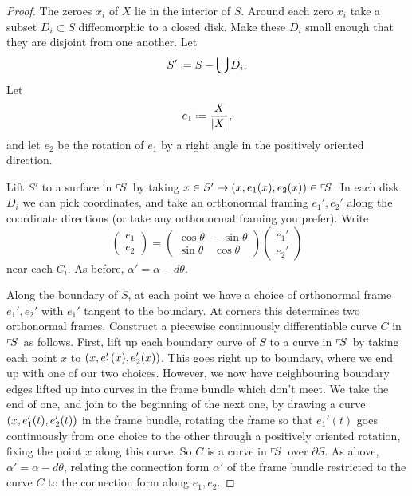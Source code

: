 \begin{proof}
The zeroes \(x_i\) of \(X\) lie in the interior of \(S\).
Around each zero \(x_i\) take a subset \(D_i \subset S\) diffeomorphic to a closed disk.
Make these \(D_i\) small enough that they are disjoint from one another.
Let 
\[
S' \defeq S-\bigcup D_i.
\]
Let 
\[
e_1 \defeq \frac{X}{\norm{X}},
\]
and let \(e_2\) be the rotation of \(e_1\) by a right angle in the positively oriented direction.

Lift \(S'\) to a surface in \(\left\ulcorner\!S\right.\) by taking \(x \in S' \mapsto \left(x,e_1(x),e_2(x)\right) \in \left\ulcorner\!S\right.\).
In each disk \(D_i\) we can pick coordinates, and take an orthonormal framing \(e_1', e_2'\) along the coordinate directions (or take any orthonormal framing you prefer).
Write
\[
\begin{pmatrix}
e_1 \\
e_2
\end{pmatrix}
=
\begin{pmatrix}
\cos \theta & -\sin \theta \\
\sin \theta & \cos \theta
\end{pmatrix}
\begin{pmatrix}
e_1' \\
e_2'
\end{pmatrix}
\]
near each \(C_i\).
As before, \(\alpha'=\alpha-d\theta\).

Along the boundary of \(S\), at each point we have a choice of orthonormal frame \(e_1', e_2'\) with \(e_1'\) tangent to the boundary. 
At corners this determines two orthonormal frames.
Construct a piecewise continuously differentiable curve \(C\) in \(\left\ulcorner\!S\right.\) as follows.
First, lift up each boundary curve of \(S\) to a curve in \(\left\ulcorner\!S\right.\) by taking each point \(x\) to \(\left(x,e_1'(x),e_2'(x)\right)\).
This goes right up to boundary, where we end up with one of our two choices.
However, we now have neighbouring boundary edges lifted up into curves in the frame bundle which don't meet.
We take the end of one, and join to the beginning of the next one, by drawing a curve \(\left(x,e_1'(t), e_2'(t)\right)\) in the frame bundle, rotating the frame so that \(e_1'(t)\) goes continuously from one choice to the other through a positively oriented rotation, fixing the point \(x\) along this curve. 
So \(C\) is a curve in \(\left\ulcorner\!S\right.\) over \(\partial S\).
As above, \(\alpha' = \alpha - d\theta\),
relating the connection form \(\alpha'\) of the frame bundle restricted to the curve \(C\) to the connection form along \(e_1, e_2\).


\end{proof}
